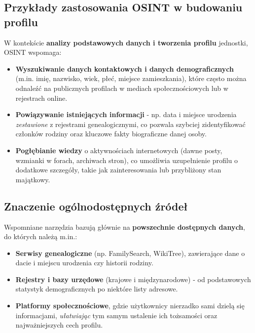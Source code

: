 \subsection{Przykłady zastosowania OSINT w budowaniu profilu}
W kontekście \textbf{analizy podstawowych danych i tworzenia profilu} jednostki, OSINT wspomaga:
\begin{itemize}
    \item \textbf{Wyszukiwanie danych kontaktowych i danych demograficznych} (m.in. imię, nazwisko, wiek, płeć, miejsce zamieszkania), które często można odnaleźć na publicznych profilach w mediach społecznościowych lub w rejestrach online.
    \item \textbf{Powiązywanie istniejących informacji} - np. data i miejsce urodzenia \emph{zestawione} z rejestrami genealogicznymi, co pozwala szybciej zidentyfikować członków rodziny oraz kluczowe fakty biograficzne danej osoby.
    \item \textbf{Pogłębianie wiedzy} o aktywnościach internetowych (dawne posty, wzmianki w forach, archiwach stron), co umożliwia uzupełnienie profilu o dodatkowe szczegóły, takie jak zainteresowania lub przybliżony stan majątkowy.
\end{itemize}

\subsection{Znaczenie ogólnodostępnych źródeł}
Wspomniane narzędzia bazują głównie na \textbf{powszechnie dostępnych danych}, do których należą m.in.:
\begin{itemize}
    \item \textbf{Serwisy genealogiczne} (np. FamilySearch, WikiTree), zawierające dane o dacie i miejscu urodzenia czy historii rodziny.
    \item \textbf{Rejestry i bazy urzędowe} (krajowe i międzynarodowe) - od podstawowych statystyk demograficznych po niektóre listy adresowe.
    \item \textbf{Platformy społecznościowe}, gdzie użytkownicy nierzadko sami dzielą się informacjami, \emph{ułatwiając} tym samym ustalenie ich tożsamości oraz najważniejszych cech profilu.
\end{itemize}

